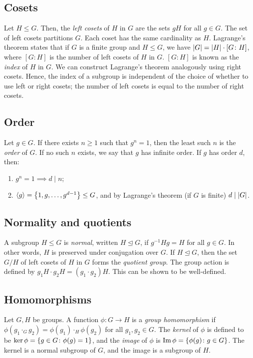 \subsection{Cosets}
Let \( H \leq G \).
Then, the \textit{left cosets} of \( H \) in \( G \) are the sets \( gH \) for all \( g \in G \).
The set of left cosets partitions \( G \).
Each coset has the same cardinality as \( H \).
Lagrange's theorem states that if \( G \) is a finite group and \( H \leq G \), we have \( \abs{G} = \abs{H} \cdot [G \colon H] \), where \( [G \colon H] \) is the number of left cosets of \( H \) in \( G \).
\( [G \colon H] \) is known as the \textit{index} of \( H \) in \( G \).
We can construct Lagrange's theorem analogously using right cosets.
Hence, the index of a subgroup is independent of the choice of whether to use left or right cosets; the number of left cosets is equal to the number of right cosets.

\subsection{Order}
Let \( g \in G \).
If there exists \( n \geq 1 \) such that \( g^n = 1 \), then the least such \( n \) is the \textit{order} of \( G \).
If no such \( n \) exists, we say that \( g \) has infinite order.
If \( g \) has order \( d \), then:
\begin{enumerate}
	\item \( g^n = 1 \implies d \mid n \);
	\item \( \langle{} g \rangle = \qty{1, g, \dots, g^{d-1}} \leq G \), and by Lagrange's theorem (if \( G \) is finite) \( d \mid \abs{G} \).
\end{enumerate}

\subsection{Normality and quotients}
A subgroup \( H \leq G \) is \textit{normal}, written \( H \trianglelefteq G \), if \( g^{-1} H g = H \) for all \( g \in G \).
In other words, \( H \) is preserved under conjugation over \( G \).
If \( H \trianglelefteq G \), then the set \( G/H \) of left cosets of \( H \) in \( G \) forms the \textit{quotient group}.
The group action is defined by \( g_1 H \cdot g_2 H = (g_1 \cdot g_2) H \).
This can be shown to be well-defined.

\subsection{Homomorphisms}
Let \( G, H \) be groups.
A function \( \phi \colon G \to H \) is a \textit{group homomorphism} if \( \phi(g_1 \cdot_G g_2) = \phi(g_1) \cdot_H \phi(g_2) \) for all \( g_1, g_2 \in G \).
The \textit{kernel} of \( \phi \) is defined to be \( \ker \phi = \qty{g \in G \colon \phi(g) = 1} \), and the \textit{image} of \( \phi \) is \( \Im \phi = \qty{\phi(g) \colon g \in G} \).
The kernel is a normal subgroup of \( G \), and the image is a subgroup of \( H \).

